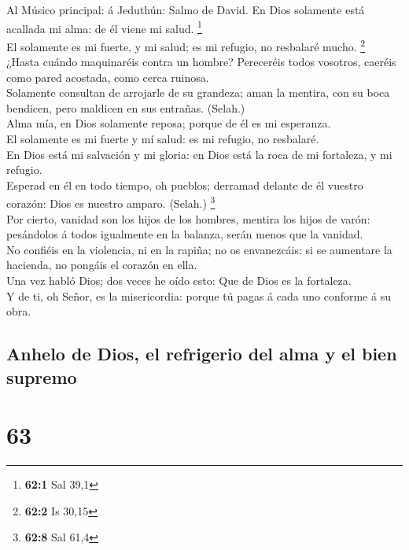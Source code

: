  Al Músico principal: á Jeduthún: Salmo de David. En Dios
solamente está acallada mi alma: de él viene mi salud. \footnote{\textbf{62:1}
  Sal 39,1}\\
 El solamente es mi fuerte, y mi salud; es mi refugio, no
resbalaré mucho. \footnote{\textbf{62:2} Is 30,15}\\
 ¿Hasta cuándo maquinaréis contra un hombre? Pereceréis
todos vosotros, caeréis como pared acostada, como cerca ruinosa.\\
 Solamente consultan de arrojarle de su grandeza; aman la
mentira, con su boca bendicen, pero maldicen en sus entrañas. (Selah.)\\
 Alma mía, en Dios solamente reposa; porque de él es mi
esperanza.\\
 El solamente es mi fuerte y mí salud: es mi refugio, no
resbalaré.\\
 En Dios está mi salvación y mi gloria: en Dios está la roca
de mi fortaleza, y mi refugio.\\
 Esperad en él en todo tiempo, oh pueblos; derramad delante
de él vuestro corazón: Dios es nuestro amparo. (Selah.) \footnote{\textbf{62:8}
  Sal 61,4}\\
 Por cierto, vanidad son los hijos de los hombres, mentira
los hijos de varón: pesándolos á todos igualmente en la balanza, serán
menos que la vanidad.\\
 No confiéis en la violencia, ni en la rapiña; no os
envanezcáis: si se aumentare la hacienda, no pongáis el corazón en
ella.\\
 Una vez habló Dios; dos veces he oído esto: Que de Dios es
la fortaleza.\\
 Y de ti, oh Señor, es la misericordia: porque tú pagas á
cada uno conforme á su obra.

\hypertarget{anhelo-de-dios-el-refrigerio-del-alma-y-el-bien-supremo}{%
\subsection{Anhelo de Dios, el refrigerio del alma y el bien
supremo}\label{anhelo-de-dios-el-refrigerio-del-alma-y-el-bien-supremo}}

\hypertarget{section-62}{%
\section{63}\label{section-62}}

